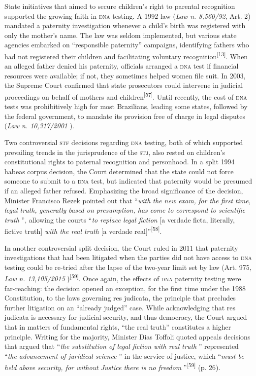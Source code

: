 \documentclass{article}
\begin{document}
State initiatives that aimed to secure children’s right to parental recognition
supported the growing faith in \textsc{dna} testing. A 1992 law (\textit{Law n. 8,560/92}, Art. 2) mandated a paternity investigation whenever a child’s birth was
registered with only the mother’s name. The law was seldom implemented, but
various state agencies embarked on “responsible paternity” campaigns,
identifying fathers who had not registered their children and facilitating
voluntary recognition\textsuperscript{[}\textsuperscript{13}\textsuperscript{]}. When an alleged father denied his paternity, officials arranged a \textsc{dna} test if
financial resources were available; if not, they sometimes helped women file
suit. In 2003, the Supreme Court confirmed that state prosecutors could
intervene in judicial proceedings on behalf of mothers and children\textsuperscript{[}\textsuperscript{57}\textsuperscript{]}. Until recently, the cost of \textsc{dna} tests was prohibitively high for most
Brazilians, leading some states, followed by the federal government, to mandate
its provision free of charge in legal disputes (\textit{Law n. 10,317/2001}
).

Two controversial \textsc{stf} decisions regarding \textsc{dna} testing, both of which supported
prevailing trends in the jurisprudence of the \textsc{stj}, also rested on children’s
constitutional rights to paternal recognition and personhood. In a split 1994
habeas corpus decision, the Court determined that the state could not force
someone to submit to a \textsc{dna} test, but indicated that paternity would be presumed
if an alleged father refused. Emphasizing the broad significance of the
decision, Minister Francisco Rezek pointed out that “\textit{with the new exam,
for the first time, legal truth, generally based on presumption, has come to
correspond to scientific truth}
”, allowing the courts “\textit{to replace legal fiction}
[a verdade ficta, literally, fictive truth] \textit{with the real truth}
[a verdade real]”\textsuperscript{[}\textsuperscript{58}\textsuperscript{]}.

In another controversial split decision, the Court ruled in 2011 that paternity
investigations that had been litigated when the parties did not have access to
\textsc{dna} testing could be re-tried after the lapse of the two-year limit set by law
(Art. 975, \textit{Law n. 13,105/2015}
)\textsuperscript{[}\textsuperscript{59}\textsuperscript{]}. Once again, the effects of \textsc{dna} paternity testing were far-reaching: the
decision opened an exception, for the first time under the 1988 Constitution, to
the laws governing res judicata, the principle that precludes further litigation
on an “already judged” case. While acknowledging that res judicata is necessary
for judicial security, and thus democracy, the Court argued that in matters of
fundamental rights, “the real truth” constitutes a higher principle. Writing for
the majority, Minister Dias Toffoli quoted appeals decisions that argued that
“\textit{the substitution of legal fiction with real truth}
” represented “\textit{the advancement of juridical science}
” in the service of justice, which “\textit{must be held above security, for
without Justice there is no freedom}
”\textsuperscript{[}\textsuperscript{59}\textsuperscript{]}
(p. 26).
\end{document}
